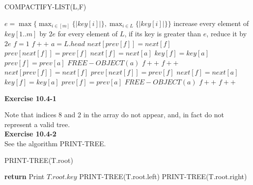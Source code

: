 \documentclass{article}
\begin{document}
\begin{algorithm}
\caption{COMPACTIFY-LIST(L,F)}
\begin{algorithmic}
\State \Return
\EndIf
\State $e = \max\{ \max_{i\in[m]} \{|key[i]|\},\max_{i\in L}\{|key[i]|\}\}$
\State increase every element of $key[1..m]$ by $2e$
\State for every element of $L$, if its key is greater than $e$, reduce it by $2e$
\State $f = 1$
\State $f++$
\EndWhile
\State $a = L.head$
\State $next[prev[f]] = next[f]$
\State $prev[next[f]] = prev[f]$
\State $next[f] = next[a]$
\State $key[f] = key[a]$
\State $prev[f] = prev[a]$
\State $FREE-OBJECT(a)$
\State $f++$
\State $f++$
\EndWhile
\EndIf
{}
\State $next[prev[f]] = next[f]$
\State $prev[next[f]] = prev[f]$
\State $next[f] = next[a]$
\State $key[f] = key[a]$
\State $prev[f] = prev[a]$
\State $FREE-OBJECT(a)$
\State $f++$
\State $f++$
\EndWhile
\EndIf
\EndWhile
\end{algorithmic}
\end{algorithm}

\noindent\textbf{ Exercise 10.4-1} \\


Note that indices 8 and 2 in the array do not appear, and, in fact do not represent a valid tree.\\

\noindent\textbf{Exercise 10.4-2}\\

See the algorithm PRINT-TREE.

\begin{algorithm}
\caption{PRINT-TREE(T.root)}
\begin{algorithmic}
	\State \textbf{return}
\Else
	\State Print $T.root.key$
	\State PRINT-TREE(T.root.left)
	\State PRINT-TREE(T.root.right)
\EndIf
\end{algorithmic}
\end{algorithm}
\end{document}
